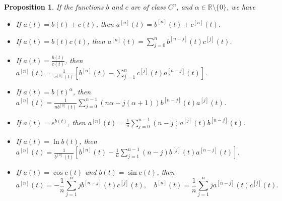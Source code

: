 \documentclass[12pt,twoside]{article}
\newtheorem{proposition}{Proposition}[section]
\newcommand{\RR}{{\mathbb R}}               %
\begin{document}
\begin{proposition}\label{prop:leibniz}
If the functions $b$ and $c$ are of class $C^n$, and
$\alpha\in\RR\setminus\{0\}$, we have
\begin{itemize}
\renewcommand{\itemsep}{0pt}
\item[{\rm 1.}] If $a(t)=b(t)\pm c(t)$, then
   $a^{[n]}(t)=b^{[n]}(t)\pm c^{[n]}(t)$.

\item[{\rm 2.}] If $a(t)=b(t)c(t)$, then
   $a^{[n]}(t)=\displaystyle\sum_{j=0}^n b^{[n-j]}(t)c^{[j]}(t)$.

\item[{\rm 3.}] If $a(t)=\displaystyle\frac{b(t)}{c(t)}$, then
   $a^{[n]}(t)=\displaystyle\frac{1}{c^{[0]}(t)}
   \left[ b^{[n]}(t)-\sum_{j=1}^n c^{[j]}(t) a^{[n-j]}(t)\right]$.

\item[{\rm 4.}] If $a(t)=\displaystyle b(t)^{\alpha}$, then
   $a^{[n]}(t)=\displaystyle\frac{1}{nb^{[0]}(t)}
   \sum_{j=0}^{n-1}\left(n\alpha-j(\alpha+1)\right)b^{[n-j]}(t)a^{[j]}(t)$.

\item[{\rm 5.}] If $a(t)=\displaystyle e^{b(t)}$, then
   $a^{[n]}(t)=\displaystyle\frac{1}{n}
   \sum_{j=0}^{n-1}\left(n-j\right)a^{[j]}(t)b^{[n-j]}(t)$.

\item[{\rm 6.}] If $a(t)=\ln b(t)$, then
   $a^{[n]}(t)=\displaystyle\frac{1}{b^{[0]}(t)}\left[
   b^{[n]}(t)-\frac{1}{n}\sum_{j=1}^{n-1}(n-j)b^{[j]}(t)a^{[n-j]}(t)
   \right]$.

\item[{\rm 7.}] If $a(t)=\cos c(t)$ and $b(t)=\sin c(t)$, then
   \[
   a^{[n]}(t)=-\frac{1}{n}\sum_{j=1}^{n}jb^{[n-j]}(t)c^{[j]}(t),\quad
   b^{[n]}(t)= \frac{1}{n}\sum_{j=1}^{n}ja^{[n-j]}(t)c^{[j]}(t).
   \]
\end{itemize}
\end{proposition}
\end{document}

